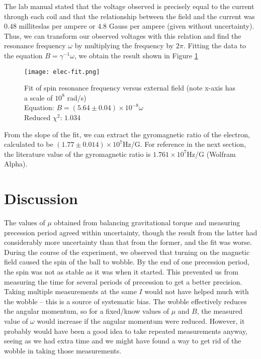 \documentclass{amsart}
\numberwithin{equation}{section}
\begin{document}
The lab manual stated that the voltage observed is precisely equal to the current through each coil and that the relationship between the field and the current was $0.48$ milliteslas per ampere or $4.8$ Gauss per ampere (given without uncertainty). Thus, we can transform our observed voltages with this relation and find the resonance frequency $\omega$ by multiplying the frequency by $2\pi$. Fitting the data to the equation $B=\gamma^{-1}\omega$, we obtain the result shown in Figure \ref{elecfit}

\begin{figure}
\centering
\texttt{[image: elec-fit.png]}
\caption{Fit of spin resonance frequency versus external field (note x-axis has a scale of $10^8$ rad/s)\\
Equation: $B=(5.64\pm0.04)\times10^{-8}\omega$\\
Reduced $\chi^2$: $1.034$}
\label{elecfit}
\end{figure}

From the slope of the fit, we can extract the gyromagnetic ratio of the electron, calculated to be $(1.77\pm0.014)\times10^7$Hz/G. For reference in the next section, the literature value of the gyromagnetic ratio is $1.761\times10^7$Hz/G (Wolfram Alpha).
\FloatBarrier
\section{Discussion}
The values of $\mu$ obtained from balancing gravitational torque and measuring precession period agreed within uncertainty, though the result from the latter had considerably more uncertainty than that from the former, and the fit was worse. During the course of the experiment, we observed that turning on the magnetic field caused the spin of the ball to wobble. By the end of one precession period, the spin was not as stable as it was when it started. This prevented us from measuring the time for several periods of precession to get a better precision. Taking multiple measurements at the same $I$ would not have helped much with the wobble -- this is a source of systematic bias. The wobble effectively reduces the angular momentum, so for a fixed/know values of $\mu$ and $B$, the measured value of $\omega$ would increase if the angular momentum were reduced. However, it probably would have been a good idea to take repeated measurements anyway, seeing as we had extra time and we might have found a way to get rid of the wobble in taking those measurements. 
\end{document}
